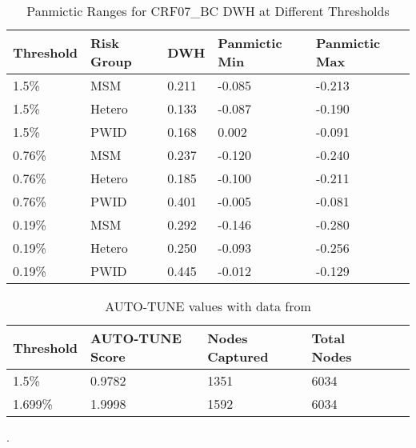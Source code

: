 \documentclass[utf8]{FrontiersinHarvard} %
\begin{document}
\begin{table}[h!]
\centering
\begin{tabularx}{\textwidth}{|X|X|X|X|X|}
\hline
Threshold & Risk Group & DWH & Panmictic Min & Panmictic Max \\
\hline
1.5\% & MSM & 0.211 & -0.085 & -0.213 \\
1.5\% & Hetero & 0.133 & -0.087 & -0.190 \\
1.5\% & PWID & 0.168 & 0.002 & -0.091 \\
\hline
0.76\% & MSM & 0.237 & -0.120 & -0.240 \\
0.76\% & Hetero & 0.185 & -0.100 & -0.211 \\
0.76\% & PWID & 0.401 & -0.005 & -0.081 \\
\hline
0.19\% & MSM & 0.292 & -0.146 & -0.280 \\
0.19\% & Hetero & 0.250 & -0.093 & -0.256 \\
0.19\% & PWID & 0.445 & -0.012 & -0.129 \\
\hline
\end{tabularx}
\caption{Panmictic Ranges for CRF07\_BC DWH at Different Thresholds}
\label{table:panmictic}
\end{table}

\begin{table}[h!]
\centering
\begin{tabularx}{\textwidth}{|X|X|X|X|X|X|}
\hline
Threshold & AUTO-TUNE Score & Nodes Captured & Total Nodes \\
\hline
1.5\% & 0.9782 & 1351 & 6034 \\
1.699\% & 1.9998 & 1592 & 6034 \\
\hline
\end{tabularx}
\caption{AUTO-TUNE values with data from \cite{rhee_national_2019}}.
\label{table:rhee}
\end{table}
\end{document}
